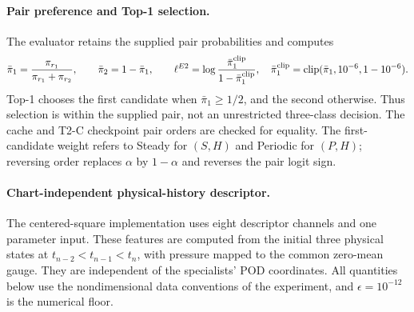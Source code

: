 \paragraph{Pair preference and Top-1 selection.}
The evaluator retains the supplied pair probabilities and computes
\begin{equation}
  \bar\pi_1=\frac{\pi_{r_1}}{\pi_{r_1}+\pi_{r_2}},
  \qquad \bar\pi_2=1-\bar\pi_1,\qquad
  \ell^{E2}=\log\frac{\bar\pi_1^{\rm clip}}
                           {1-\bar\pi_1^{\rm clip}},
  \quad
  \bar\pi_1^{\rm clip}
  =\operatorname{clip}(\bar\pi_1,10^{-6},1-10^{-6}).
  \label{eq:app_pair_logit}
\end{equation}
Top-1 chooses the first candidate when $\bar\pi_1\geq1/2$,
and the second otherwise. Thus selection is within the supplied
pair, not an unrestricted three-class decision.
The cache and T2-C checkpoint pair orders are checked for equality.
The first-candidate weight refers to Steady for $(S,H)$ and
Periodic for $(P,H)$; reversing order replaces $\alpha$ by
$1-\alpha$ and reverses the pair logit sign.

\paragraph{Chart-independent physical-history descriptor.}
The centered-square implementation uses eight descriptor channels and one parameter input. These features are computed from the initial three physical states at $t_{n-2}<t_{n-1}<t_n$, with pressure mapped to the common zero-mean gauge. They are independent of the specialists' POD coordinates. All quantities below use the nondimensional data conventions of the experiment, and $\epsilon=10^{-12}$ is the numerical floor.

